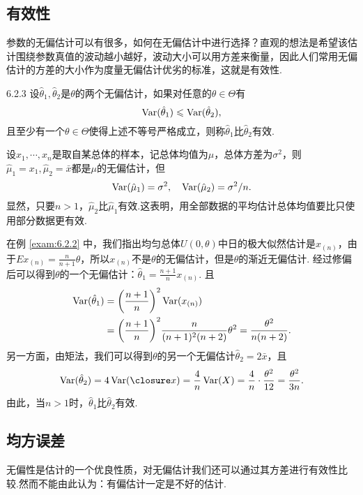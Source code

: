 \subsection{有效性\label{ssec:6.2.3}}
参数的无偏估计可以有很多，如何在无偏估计中进行选择？直观的想法是希望该估计围绕参数真值的波动越小越好，波动大小可以用方差来衡量，因此人们常用无偏估计的方差的大小作为度量无偏估计优劣的标准，这就是有效性.

\begin{definition}{}{6.2.3}
  设$\hat\theta_1,\hat\theta_2$是$\theta$的两个无偏估计，如果对任意的$\theta\in\Theta$有
  \[
    \operatorname{Var}(\hat\theta_1) \leqslant \operatorname{Var}(\hat\theta_2),
  \]
  且至少有一个$\theta\in\Theta$使得上述不等号严格成立，则称$\hat\theta_1$比$\hat\theta_2$有效.
\end{definition}

\begin{example}\label{exam:6.2.6}
   设$x_1,\cdots,x_n$是取自某总体的样本，记总体均值为$\mu$，总体方差为$\sigma^2$，则$\hat\mu_1=x_1,\hat\mu_2=\bar x$都是$\mu$的无偏估计，但
   \[
     \operatorname{Var}(\hat \mu_1) = \sigma^2,\quad \operatorname{Var}(\hat\mu_2) = \sigma^2/n.
   \]
   显然，只要$n>1$，$\hat\mu_2$比$\hat\mu_1$有效.这表明，用全部数据的平均估计总体均值要比只使用部分数据更有效.
\end{example}

\begin{example}\label{exam:6.2.7}
  在例 \ref{exam:6.2.2} 中，我们指出均匀总体$U(0,\theta)$中日的极大似然估计是$x_{(n)}$，由于$Ex_{(n)}=\frac n{n+1}\theta$，所以$ x_{(n)}$不是$\theta$的无偏估计，但是$\theta$的渐近无偏估计. 经过修偏后可以得到$\theta$的一个无偏估计：$\hat\theta_1=\frac{n+1}nx_{(n)}$. 且
  \begin{align*}
    \Var(\hat\theta_1) & = \left(\frac{n+1}n\right)^2 \Var(x_{(n)}) \\
    & = \left(\frac{n+1}n\right)^2 \frac n{(n+1)^2(n+2)}\theta^2 =
    \frac{\theta^2}{n(n+2)}.
  \end{align*}
  另一方面，由矩法，我们可以得到$\theta$的另一个无偏估计$\hat\theta_2=2\bar x$，且
  \[
    \Var(\hat\theta_2) = 4\Var(\bar x) = \frac4n\Var(X) = \frac4n\cdot \frac{\theta^2}{12} = \frac{\theta^2}{3n}.
  \]
  由此，当$n>1$时，$\hat\theta_1$比$\hat\theta_2$有效.
\end{example}

\subsection{均方误差\label{ssec:6.2.4}}
无偏性是估计的一个优良性质，对无偏估计我们还可以通过其方差进行有效性比较.然而不能由此认为：有偏估计一定是不好的估计.

